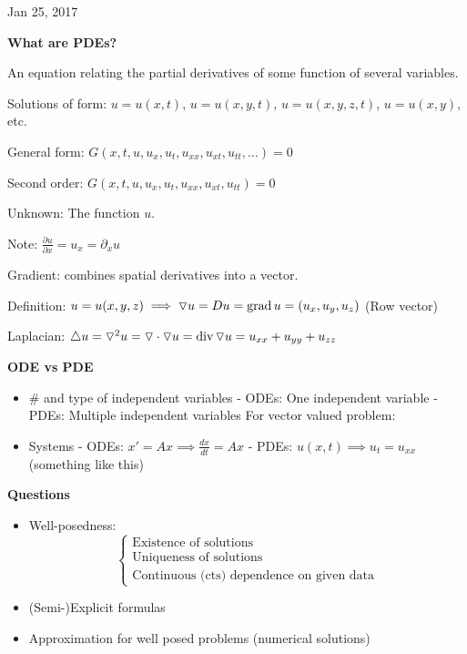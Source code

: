\documentclass[main.tex]{subfiles}
\begin{document}
\hrulefill

Jan 25, 2017

\vspace{3mm}

\textbf{What are PDEs?}

An equation relating the partial derivatives of some function of several variables.

Solutions of form: $u = u(x, t)$, $u = u(x, y, t)$, $u = u(x, y, z, t)$, $u = u(x, y)$, etc.

General form: $G(x, t, u, u_x, u_t, u_{xx}, u_{xt}, u_{tt}, ...) = 0$

Second order: $G(x, t, u, u_x, u_t, u_{xx}, u_{xt}, u_{tt}) = 0$

Unknown: The function $u$.

Note: $\frac{\partial u}{\partial x} = u_x = \partial_x u$

Gradient: combines spatial derivatives into a vector.

Definition: $u = u(x,y,z) \implies \triangledown u = Du = \operatorname{grad}{u} = (u_x, u_y, u_z)$ (Row vector)

Laplacian: $\triangle u = \triangledown^2 u = \triangledown \cdot \triangledown u = \operatorname{div}{\triangledown u} = u_{xx} + u_{yy} + u_{zz}$

\textbf{ODE vs PDE}

\begin{itemize}
    \item \# and type of independent variables
        - ODEs: One independent variable
        - PDEs: Multiple independent variables
        For vector valued problem:
    \item Systems
        - ODEs: $x' = Ax \implies \frac{dx}{dt} = Ax$
        - PDEs: $u(x, t) \implies u_t = u_{xx}$ (something like this)
\end{itemize}

\textbf{Questions}
\begin{itemize}
    \item Well-posedness:
    $$
    \begin{cases}
        \textrm{Existence of solutions} \\
        \textrm{Uniqueness of solutions} \\
        \textrm{Continuous (cts) dependence on given data}
    \end{cases}$$
    \item (Semi-)Explicit formulas
    \item Approximation for well posed problems (numerical solutions)
\end{itemize}
\end{document}

